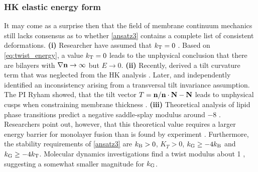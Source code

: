 
\subsubsection{HK elastic energy form}
It may come as a surprise then that the field of membrane continuum mechanics still lacks consensus as to
 whether \eqref{ansatz3} contains a complete list of consistent deformations.
\textbf{(i)} Researcher have assumed that $k_{\mathrm{T}} = 0$ \cite{Hamm2000, TerziDeserno17, C9SM02079A, PhysRevE.102.042406}.
  Based on \eqref{eq:twist_energy}, a value $k_{\mathrm{T}} = 0$ leads to the
  unphysical conclusion that there are bilayers with $\nabla {\bf n} \to \infty$ but $E \to 0.$ 
  \textbf{(ii)}
  Recently, \cite{TerziDeserno17} derived a tilt curvature term that was neglected from the HK analysis \cite{Hamm2000}.
  Later, \cite{C9SM02079A} 
  and \cite{PhysRevE.102.042406} independently identified an inconsistency \cite{TerziDeserno17} arising
  from a transversal tilt invariance assumption.
  The PI Ryham showed,  that the tilt vector $T = {\bf n}/{\bf n}\cdot {\bf N} - {\bf N}$ leads to unphysical cusps when constraining membrane thickness  \cite{RyKlYaCo16}.  
  \textbf{(iii)}
  Theoretical analysis of lipid phase transitions predict a negative saddle-splay modulus around $-8$ \kBT\;
\cite{SIEGEL2004366,SIEGEL20085200}. Researchers point out, however, that this theoretical value requires a larger energy 
barrier for monolayer fusion than is found by experiment \cite{FrRoPi17,Tran7106,TerziDeserno17}.
Furthermore, the stability requirements of \eqref{ansatz3} are $k_{\mathrm{B}} > 0$, $K_T > 0$, $k_{\mathrm{G}} \geq -4k_{\mathrm{B}}$
and $k_{\mathrm{G}} \geq -4k_{\mathrm{T}}$. Molecular dynamics investigations find a twist modulus about 1 \kBT \cite{LeVeWa14},
suggesting a somewhat smaller magnitude for $k_{\mathrm{G}}$.

  
